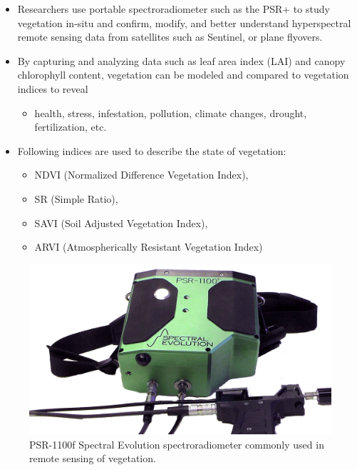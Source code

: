 \documentclass[11pt,dvipsnames,ignorenonframetext,aspectratio=169]{beamer}
\providecommand{\tightlist}{%
  \setlength{\itemsep}{0pt}\setlength{\parskip}{0pt}}
\begin{document}
\begin{frame}{}
\protect\hypertarget{section-4}{}
\begin{itemize}
\tightlist
\item
  Researchers use portable spectroradiometer such as the PSR+ to study
  vegetation in-situ and confirm, modify, and better understand
  hyperspectral remote sensing data from satellites such as Sentinel, or
  plane flyovers.
\item
  By capturing and analyzing data such as leaf area index (LAI) and
  canopy chlorophyll content, vegetation can be modeled and compared to
  vegetation indices to reveal

  \begin{itemize}
  \tightlist
  \item
    health, stress, infestation, pollution, climate changes, drought,
    fertilization, etc.
  \end{itemize}
\item
  Following indices are used to describe the state of vegetation:

  \begin{itemize}
  \tightlist
  \item
    NDVI (Normalized Difference Vegetation Index),
  \item
    SR (Simple Ratio),
  \item
    SAVI (Soil Adjusted Vegetation Index),
  \item
    ARVI (Atmospherically Resistant Vegetation Index)
  \end{itemize}
\end{itemize}
\end{frame}

\begin{frame}{}
\protect\hypertarget{section-5}{}
\begin{figure}
\includegraphics[width=0.45\linewidth]{../images/spectral_evolution_portable_spectroradiometer} \caption{PSR-1100f Spectral Evolution spectroradiometer commonly used in remote sensing of vegetation.}\label{fig:spectroradiometer}
\end{figure}
\end{frame}
\end{document}

